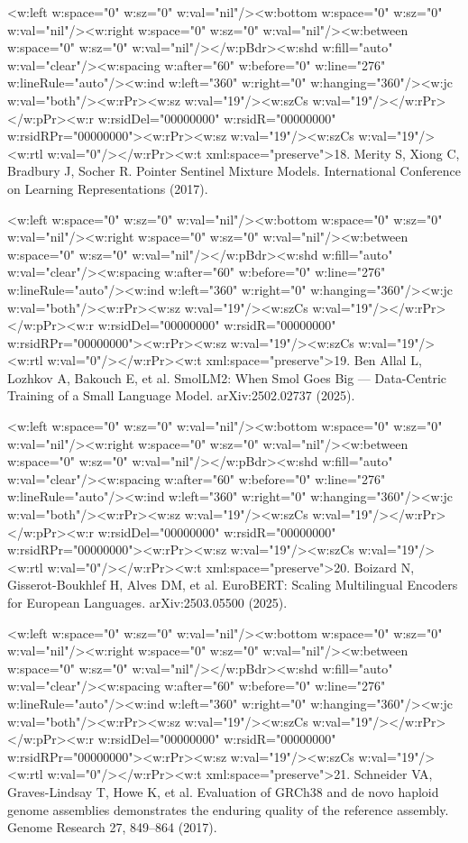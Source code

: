 \documentclass[11pt]{article}
\begin{document}
<w:left w:space="0" w:sz="0" w:val="nil"/><w:bottom w:space="0" w:sz="0" w:val="nil"/><w:right w:space="0" w:sz="0" w:val="nil"/><w:between w:space="0" w:sz="0" w:val="nil"/></w:pBdr><w:shd w:fill="auto" w:val="clear"/><w:spacing w:after="60" w:before="0" w:line="276" w:lineRule="auto"/><w:ind w:left="360" w:right="0" w:hanging="360"/><w:jc w:val="both"/><w:rPr><w:sz w:val="19"/><w:szCs w:val="19"/></w:rPr></w:pPr><w:r w:rsidDel="00000000" w:rsidR="00000000" w:rsidRPr="00000000"><w:rPr><w:sz w:val="19"/><w:szCs w:val="19"/><w:rtl w:val="0"/></w:rPr><w:t xml:space="preserve">18. Merity S, Xiong C, Bradbury J, Socher R. Pointer Sentinel Mixture Models. International Conference on Learning Representations (2017).

<w:left w:space="0" w:sz="0" w:val="nil"/><w:bottom w:space="0" w:sz="0" w:val="nil"/><w:right w:space="0" w:sz="0" w:val="nil"/><w:between w:space="0" w:sz="0" w:val="nil"/></w:pBdr><w:shd w:fill="auto" w:val="clear"/><w:spacing w:after="60" w:before="0" w:line="276" w:lineRule="auto"/><w:ind w:left="360" w:right="0" w:hanging="360"/><w:jc w:val="both"/><w:rPr><w:sz w:val="19"/><w:szCs w:val="19"/></w:rPr></w:pPr><w:r w:rsidDel="00000000" w:rsidR="00000000" w:rsidRPr="00000000"><w:rPr><w:sz w:val="19"/><w:szCs w:val="19"/><w:rtl w:val="0"/></w:rPr><w:t xml:space="preserve">19. Ben Allal L, Lozhkov A, Bakouch E, et al. SmolLM2: When Smol Goes Big — Data-Centric Training of a Small Language Model. arXiv:2502.02737 (2025).

<w:left w:space="0" w:sz="0" w:val="nil"/><w:bottom w:space="0" w:sz="0" w:val="nil"/><w:right w:space="0" w:sz="0" w:val="nil"/><w:between w:space="0" w:sz="0" w:val="nil"/></w:pBdr><w:shd w:fill="auto" w:val="clear"/><w:spacing w:after="60" w:before="0" w:line="276" w:lineRule="auto"/><w:ind w:left="360" w:right="0" w:hanging="360"/><w:jc w:val="both"/><w:rPr><w:sz w:val="19"/><w:szCs w:val="19"/></w:rPr></w:pPr><w:r w:rsidDel="00000000" w:rsidR="00000000" w:rsidRPr="00000000"><w:rPr><w:sz w:val="19"/><w:szCs w:val="19"/><w:rtl w:val="0"/></w:rPr><w:t xml:space="preserve">20. Boizard N, Gisserot-Boukhlef H, Alves DM, et al. EuroBERT: Scaling Multilingual Encoders for European Languages. arXiv:2503.05500 (2025).

<w:left w:space="0" w:sz="0" w:val="nil"/><w:bottom w:space="0" w:sz="0" w:val="nil"/><w:right w:space="0" w:sz="0" w:val="nil"/><w:between w:space="0" w:sz="0" w:val="nil"/></w:pBdr><w:shd w:fill="auto" w:val="clear"/><w:spacing w:after="60" w:before="0" w:line="276" w:lineRule="auto"/><w:ind w:left="360" w:right="0" w:hanging="360"/><w:jc w:val="both"/><w:rPr><w:sz w:val="19"/><w:szCs w:val="19"/></w:rPr></w:pPr><w:r w:rsidDel="00000000" w:rsidR="00000000" w:rsidRPr="00000000"><w:rPr><w:sz w:val="19"/><w:szCs w:val="19"/><w:rtl w:val="0"/></w:rPr><w:t xml:space="preserve">21. Schneider VA, Graves-Lindsay T, Howe K, et al. Evaluation of GRCh38 and de novo haploid genome assemblies demonstrates the enduring quality of the reference assembly. Genome Research 27, 849–864 (2017).
\end{document}
